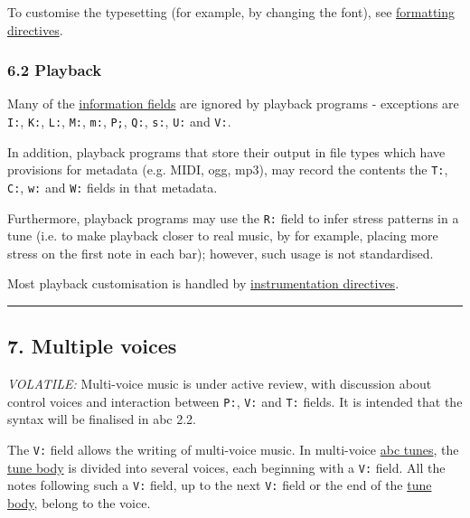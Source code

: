 \documentclass[oneside]{book}
\begin{document}
To customise the typesetting (for example, by changing the font), see
\protect\hyperlink{formatting_directives}{formatting directives}.

\hypertarget{playback}{\subsubsection{6.2 Playback}\label{playback}}

Many of the \protect\hyperlink{information_field_definition}{information
fields} are ignored by playback programs - exceptions are \texttt{I:},
\texttt{K:}, \texttt{L:}, \texttt{M:}, \texttt{m:}, \texttt{P;},
\texttt{Q:}, \texttt{s:}, \texttt{U:} and \texttt{V:}.

In addition, playback programs that store their output in file types
which have provisions for metadata (e.g. MIDI, ogg, mp3), may record the
contents the \texttt{T:}, \texttt{C:}, \texttt{w:} and \texttt{W:}
fields in that metadata.

Furthermore, playback programs may use the \texttt{R:} field to infer
stress patterns in a tune (i.e. to make playback closer to real music,
by for example, placing more stress on the first note in each bar);
however, such usage is not standardised.

Most playback customisation is handled by
\protect\hyperlink{instrumentation_directives}{instrumentation
directives}.

\begin{center}\rule{0.5\linewidth}{\linethickness}\end{center}

\hypertarget{multiple_voices}{\subsection{7. Multiple
voices}\label{multiple_voices}}

\emph{VOLATILE:} Multi-voice music is under active review, with
discussion about control voices and interaction between \texttt{P:},
\texttt{V:} and \texttt{T:} fields. It is intended that the syntax will
be finalised in abc 2.2.

The \texttt{V:} field allows the writing of multi-voice music. In
multi-voice \protect\hyperlink{abc_tune_definition}{abc tunes}, the
\protect\hyperlink{tune_body_definition}{tune body} is divided into
several voices, each beginning with a \texttt{V:} field. All the notes
following such a \texttt{V:} field, up to the next \texttt{V:} field or
the end of the \protect\hyperlink{tune_body_definition}{tune body},
belong to the voice.
\end{document}
